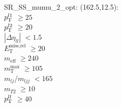 SR\_SS\_mumu\_2\_opt: (162.5,12.5): \\
$p_{\text{T}}^{l1}$ $\geq 25$ \\
$p_{\text{T}}^{l2}$ $\geq 20$ \\
$|\Delta\eta_{ll}|$ $<1.5$ \\
$E_{\text{T}}^{\text{miss,rel}}$ $\geq 20$ \\
$m_{\text{eff}}$ $\geq 240$ \\
$m_{\text{T}}^{\text{max}}$ $\geq 105$ \\
$m_{lj}$/$m_{ljj}$ $<165$ \\
$m_{T2}$ $\geq 10$ \\
$p_{\text{T}}^{ll}$ $\geq 40$ \\
